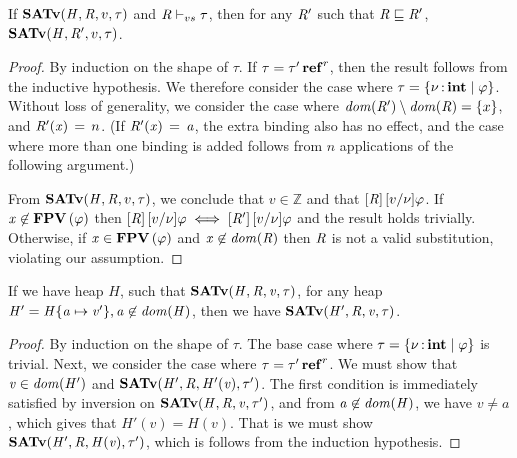 \begin{lemma} %
  \label{lem:register}
  If $ \mathbf{SATv} ( \mathit{H} , \mathit{R} , v , \tau ) $ and $ \mathit{R} \vdash _{vs}  \tau $,
  then for any $\mathit{R'}$ such that $ \mathit{R}  \sqsubseteq  \mathit{R'} $, $ \mathbf{SATv} ( \mathit{H} , \mathit{R'} , v , \tau ) $.
\end{lemma}
\begin{proof}
  By induction on the shape of $\tau$. If $\tau  =   \tau'  \operatorname{\mathbf{ref}}^{ r } $, then
  the result follows from the inductive hypothesis.
  We therefore consider the case where
  $\tau  =   \left\{{  \nu  \operatorname{:} \mathbf{int} \mid  \varphi }\right\} $. Without loss of generality, we consider
  the case where $ \mathit{dom}( \mathit{R'} )  \setminus  \mathit{dom}( \mathit{R} )  = \left\{{x}\right\}$,
  and $\mathit{R'}  (  \mathit{x}  ) \, = \, n$. (If $\mathit{R'}  (  \mathit{x}  ) \, = \, \mathit{a}$, the extra binding
  also has no effect, and the case where more than one binding is
  added follows from $n$ applications of the following argument.)

  From $ \mathbf{SATv} ( \mathit{H} , \mathit{R} , v , \tau ) $, we conclude that $ v  \in  \mathbb{Z} $ and that
  $[  \mathit{R}  ] \, [  v  /  \nu  ]  \varphi$. If $ \mathit{x}  \not\in  \mathbf{FPV} \, (  \varphi  ) $ then $[  \mathit{R}  ] \, [  v  /  \nu  ]  \varphi  \iff  [  \mathit{R'}  ] \, [  v  /  \nu  ]  \varphi$
  and the result holds trivially. Otherwise, if $ \mathit{x}  \in  \mathbf{FPV} \, (  \varphi  ) $ and $ \mathit{x}  \not\in \mathit{dom}( \mathit{R} ) $
  then $\mathit{R}$ is not a valid substitution, violating our assumption.
\end{proof}

\begin{lemma} %
  \label{lem:newaddheap}
  If we have heap $H$, such that $ \mathbf{SATv} ( \mathit{H} , \mathit{R} , \mathit{v} , \tau ) $, for any heap 
  $\mathit{H'}  =  \mathit{H}  \{  \mathit{a}  \mapsto  \mathit{v'}  \},  \mathit{a}  \not\in \mathit{dom}( \mathit{H} ) $, then we have $ \mathbf{SATv} ( \mathit{H'} , \mathit{R} , \mathit{v} , \tau ) $.
\end{lemma}
\begin{proof}
  By induction on the shape of $\tau$.
  The base case where $\tau  =   \left\{{  \nu  \operatorname{:} \mathbf{int} \mid  \varphi }\right\} $ is trivial.
  Next, we consider the case where $\tau  =   \tau'  \operatorname{\mathbf{ref}}^{ r } $.
  We must show that $ \mathit{v}  \in   \mathit{dom}( \mathit{H'} )  $ and $ \mathbf{SATv} ( \mathit{H'} , \mathit{R} , \mathit{H'}  (  \mathit{v}  ) , \tau' ) $.
  The first condition is immediately satisfied by inversion on $ \mathbf{SATv} ( \mathit{H} , \mathit{R} , \mathit{v} , \tau' ) $,
  and from $ \mathit{a}  \not\in \mathit{dom}( \mathit{H} ) $, we have $v\neq a$, which gives that $H'(v)=H(v)$.
  That is we must show $ \mathbf{SATv} ( \mathit{H'} , \mathit{R} , \mathit{H}  (  \mathit{v}  ) , \tau' ) $, which is follows from
  the induction hypothesis.
\end{proof}

